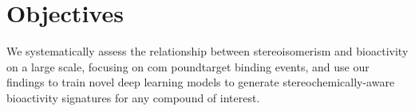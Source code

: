 \chapter{Objectives}
\label{objectives}


We systematically assess the relationship between stereoisomerism and bioactivity on a large scale, focusing on com poundtarget binding events, and use our findings to train novel deep learning models to generate stereochemically-aware bioactivity signatures for any compound of interest.